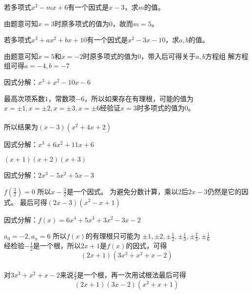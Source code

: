 \documentclass[windows,csize4,answers]{BHCexam}
\begin{document}
\begin{groups}

    \begin{questions}[]
        \question[5] 若多项式$x^2-mx+6$有一个因式是$x-3$，求$m$的值。
        \begin{solution}{0.5cm}
            \methodonly 由题意可知$x=3$时原多项式的值为$0$，故而$m=5$。
        \end{solution}
        \vspace{3.5cm}

        \question[5] 若多项式$x^3+ax^2+bx+10$有一个因式是$x^2-3x-10$，求$a,b$的值。
        \begin{solution}{0.5cm}
            \methodonly 由题意可知$x=5$和$x=-2$时原多项式的值为$0$，带入后可得关于$a,b$方程组
            解方程组可得$a=-4,b=-7$
        \end{solution}
        \vspace{3.5cm}

        \question[5] 因式分解：$x^3+x^2-10x-6$
        \begin{solution}{0.5cm}
            \methodonly 最高次项系数$1$，常数项$-6$，所以如果存在有理根，可能的值为
            $x=\pm 1, x=\pm 2, x=\pm 3,x=\pm 6$经验证$x=3$时多项式的值为$0$。\\
             \\
            所以结果为$(x-3)(x^2+4x+2)$
        \end{solution}
        \vspace{3.5cm}

        \question[5] 因式分解：$x^3+6x^2+11x+6$
        \begin{solution}{0.5cm}
            \methodonly $(x+1)(x+2)(x+3)$
        \end{solution}
        \vspace{3.5cm}

        \question[5] 因式分解：$2x^3-5x^2+5x-3$
        \begin{solution}{0.5cm}
            \methodonly $f(\frac{3}{2})=0$ 所以$x-\frac{3}{2}$是一个因式。
            为避免分数计算，乘以$2$后$2x-3$仍然是它的因式。
            最后可得$(2x-3)(x^2-x+1)$
        \end{solution}

        \question[5] 因式分解：$f(x)=6x^4+5x^3+3x^2-3x-2$
        \begin{solution}{0.5cm}
            \methodonly $a_0=-2, a_n=6$ 所以$f(x)$的有理根只可能为
            $\pm 1, \pm 2, \pm \frac{1}{2}, \pm \frac{1}{3}, \pm \frac{2}{3}, \pm \frac{1}{6}$ \\
            经检验$-\frac{1}{2}$是一个根，所以$2x+1$是$f(x)$的因式，可得 \\
            \[(2x+1)(3x^3+x^2+x-2)\] \\
            对$3x^3+x^2+x-2$来说$\frac{2}{3}$是一个根，再一次用试根法最后可得 \\
            \[(2x+1)(3x-2)(x^2+x+1)\]
        \end{solution}


\end{questions}
\end{groups}
\end{document}
